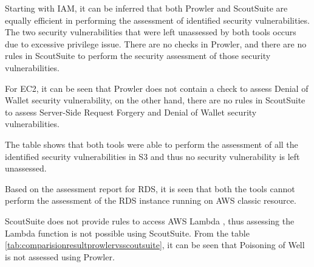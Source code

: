 \par Starting with IAM, it can be inferred that both Prowler and ScoutSuite are equally efficient in performing the assessment of identified security vulnerabilities.
The two security vulnerabilities that were left unassessed by both tools occurs due to excessive privilege issue.
There are no checks in Prowler, and there are no rules in ScoutSuite to perform the security assessment of those security vulnerabilities.

\par For EC2, it can be seen that Prowler does not
contain a check to assess Denial of Wallet security
vulnerability, on the other hand, there are no rules in
ScoutSuite to assess Server-Side Request Forgery and
Denial of Wallet security vulnerabilities.

\par The table shows that both tools were able to perform
the assessment of all the identified security vulnerabilities in S3 and thus no security vulnerability is left unassessed.

\par Based on the assessment report for RDS, it is seen that both the tools cannot perform the assessment of the RDS instance running on AWS classic resource.

\par ScoutSuite does not provide rules to access AWS
Lambda \cite{86}, thus assessing the Lambda function is
not possible using ScoutSuite.
From the table
\ref{tab:comparisionresultprowlervsscoutsuite}, it can be
seen that Poisoning of Well is not assessed using Prowler.